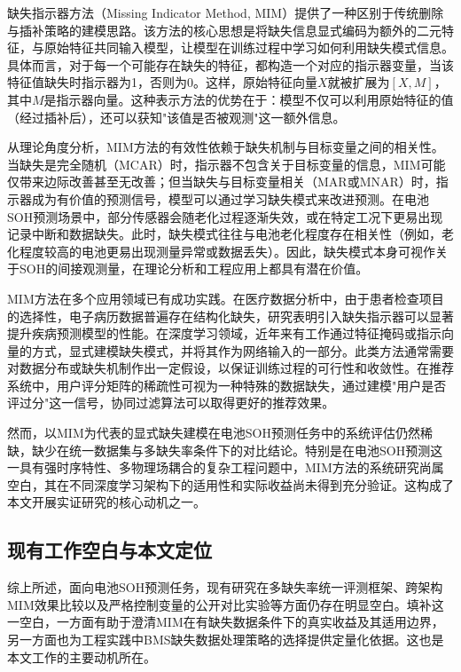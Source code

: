 \documentclass[10pt,a4paper]{ctexart}
\begin{document}
缺失指示器方法（Missing Indicator Method, MIM）提供了一种区别于传统删除与插补策略的建模思路\cite{jones1996indicator,van2023missing}。该方法的核心思想是将缺失信息显式编码为额外的二元特征，与原始特征共同输入模型，让模型在训练过程中学习如何利用缺失模式信息\cite{ipsen2022deal}。具体而言，对于每一个可能存在缺失的特征，都构造一个对应的指示器变量，当该特征值缺失时指示器为1，否则为0。这样，原始特征向量$X$就被扩展为$[X, M]$，其中$M$是指示器向量。这种表示方法的优势在于：模型不仅可以利用原始特征的值（经过插补后），还可以获知"该值是否被观测"这一额外信息。

从理论角度分析，MIM方法的有效性依赖于缺失机制与目标变量之间的相关性。当缺失是完全随机（MCAR）时，指示器不包含关于目标变量的信息，MIM可能仅带来边际改善甚至无改善；但当缺失与目标变量相关（MAR或MNAR）时，指示器成为有价值的预测信号，模型可以通过学习缺失模式来改进预测。在电池SOH预测场景中，部分传感器会随老化过程逐渐失效，或在特定工况下更易出现记录中断和数据缺失。此时，缺失模式往往与电池老化程度存在相关性（例如，老化程度较高的电池更易出现测量异常或数据丢失）。因此，缺失模式本身可视作关于SOH的间接观测量，在理论分析和工程应用上都具有潜在价值。

MIM方法在多个应用领域已有成功实践。在医疗数据分析中，由于患者检查项目的选择性，电子病历数据普遍存在结构化缺失，研究表明引入缺失指示器可以显著提升疾病预测模型的性能\cite{sisk2023imputation,ehrig2025imputation}。在深度学习领域，近年来有工作通过特征掩码或指示向量的方式，显式建模缺失模式，并将其作为网络输入的一部分\cite{ipsen2022deal,che2018recurrent}。此类方法通常需要对数据分布或缺失机制作出一定假设，以保证训练过程的可行性和收敛性。在推荐系统中，用户评分矩阵的稀疏性可视为一种特殊的数据缺失，通过建模"用户是否评过分"这一信号，协同过滤算法可以取得更好的推荐效果。

然而，以MIM为代表的显式缺失建模在电池SOH预测任务中的系统评估仍然稀缺，缺少在统一数据集与多缺失率条件下的对比结论。特别是在电池SOH预测这一具有强时序特性、多物理场耦合的复杂工程问题中，MIM方法的系统研究尚属空白，其在不同深度学习架构下的适用性和实际收益尚未得到充分验证。这构成了本文开展实证研究的核心动机之一。

\subsection{现有工作空白与本文定位}

综上所述，面向电池SOH预测任务，现有研究在多缺失率统一评测框架、跨架构MIM效果比较以及严格控制变量的公开对比实验等方面仍存在明显空白。填补这一空白，一方面有助于澄清MIM在有缺失数据条件下的真实收益及其适用边界，另一方面也为工程实践中BMS缺失数据处理策略的选择提供定量化依据。这也是本文工作的主要动机所在。
\end{document}

